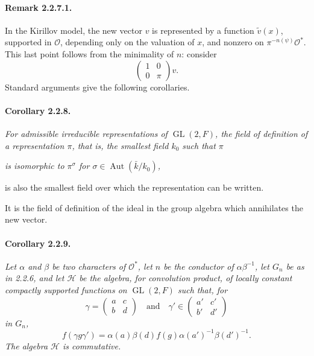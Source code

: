 \documentclass[10pt,a4paper]{article}
\providecommand{\GL}{\operatorname{GL}}
\providecommand{\Aut}{\operatorname{Aut}}
\providecommand{\OO}{\mathcal O}
\providecommand{\calH}{\mathcal H}
\begin{document}
\paragraph{Remark 2.2.7.1.} In the Kirillov model, the new vector \(v\) is represented by a function \(\tilde v(x)\), supported in \(\OO\), depending only on the valuation of \(x\), and nonzero on \(\pi^{-n(\psi)}\OO^*\). This last point follows from the minimality of \(n\): consider
\[
\begin{pmatrix}1&0\\0&\pi\end{pmatrix}v.
\]
Standard arguments give the following corollaries.

\paragraph{Corollary 2.2.8.}{\itshape  For admissible irreducible representations of \(\GL(2,F)\), the field of definition of a representation \(\pi\), that is, the smallest field \(k_0\) such that \(\pi\)\par}

\clearpage
{}
\hypertarget{authority-29}{}
{\itshape is isomorphic to \(\pi^\sigma\) for \(\sigma\in\Aut(\bar{k}/k_0)\),

is also the smallest field over which the representation can be written.\par}

It is the field of definition of the ideal in the group algebra which annihilates the new vector.

\paragraph{Corollary 2.2.9.}{\itshape  Let \(\alpha\) and \(\beta\) be two characters of \(\OO^*\), let \(n\) be the conductor of \(\alpha\beta^{-1}\), let \(G_n\) be as in 2.2.6, and let \(\calH\) be the algebra, for convolution product, of locally constant compactly supported functions on \(\GL(2,F)\) such that, for
\[
\gamma=\begin{pmatrix}a&c\\b&d\end{pmatrix}
\quad\text{and}\quad
\gamma'\in\begin{pmatrix}a'&c'\\b'&d'\end{pmatrix}
\]
in \(G_n\),
\[
f(\gamma g\gamma')=
\alpha(a)\beta(d)f(g)\alpha(a')^{-1}\beta(d')^{-1}.
\]
The algebra \(\calH\) is commutative.\par}
\end{document}
